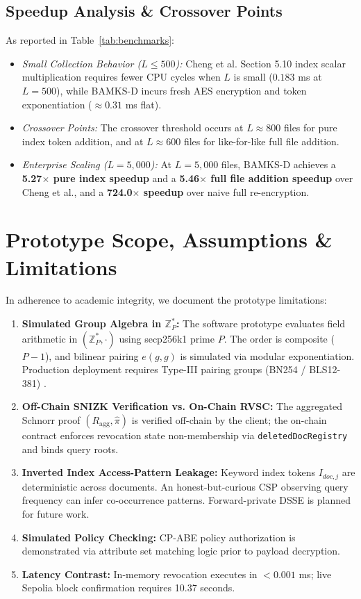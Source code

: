 \documentclass[journal,10pt,twocolumn]{IEEEtran}
\begin{document}
\subsection{Speedup Analysis \& Crossover Points}
As reported in Table~\ref{tab:benchmarks}:
\begin{itemize}
    \item \textit{Small Collection Behavior ($L \le 500$):} Cheng et al. Section 5.10 index scalar multiplication requires fewer CPU cycles when $L$ is small ($0.183$ ms at $L=500$), while BAMKS-D incurs fresh AES encryption and token exponentiation ($\approx 0.31$ ms flat).
    \item \textit{Crossover Points:} The crossover threshold occurs at $L \approx 800$ files for pure index token addition, and at $L \approx 600$ files for like-for-like full file addition.
    \item \textit{Enterprise Scaling ($L = 5,000$):} At $L = 5,000$ files, BAMKS-D achieves a \textbf{5.27$\times$ pure index speedup} and a \textbf{5.46$\times$ full file addition speedup} over Cheng et al., and a \textbf{724.0$\times$ speedup} over naive full re-encryption.
\end{itemize}

\section{Prototype Scope, Assumptions \& Limitations}
In adherence to academic integrity, we document the prototype limitations:
\begin{enumerate}
    \item \textbf{Simulated Group Algebra in $\mathbb{Z}_P^*$:} The software prototype evaluates field arithmetic in $(\mathbb{Z}_P^*, \cdot)$ using secp256k1 prime $P$. The order is composite ($P-1$), and bilinear pairing $e(g,g)$ is simulated via modular exponentiation. Production deployment requires Type-III pairing groups (BN254 / BLS12-381) \cite{waters2011expressive}.
    \item \textbf{Off-Chain SNIZK Verification vs. On-Chain RVSC:} The aggregated Schnorr proof $(R_{\text{agg}}, \hat{\pi})$ is verified off-chain by the client; the on-chain contract enforces revocation state non-membership via \texttt{deletedDocRegistry} and binds query roots.
    \item \textbf{Inverted Index Access-Pattern Leakage:} Keyword index tokens $I_{doc,j}$ are deterministic across documents. An honest-but-curious CSP observing query frequency can infer co-occurrence patterns. Forward-private DSSE \cite{bost2016sophos} is planned for future work.
    \item \textbf{Simulated Policy Checking:} CP-ABE policy authorization is demonstrated via attribute set matching logic prior to payload decryption.
    \item \textbf{Latency Contrast:} In-memory revocation executes in $< 0.001$ ms; live Sepolia block confirmation requires 10.37 seconds.
\end{enumerate}
\end{document}
